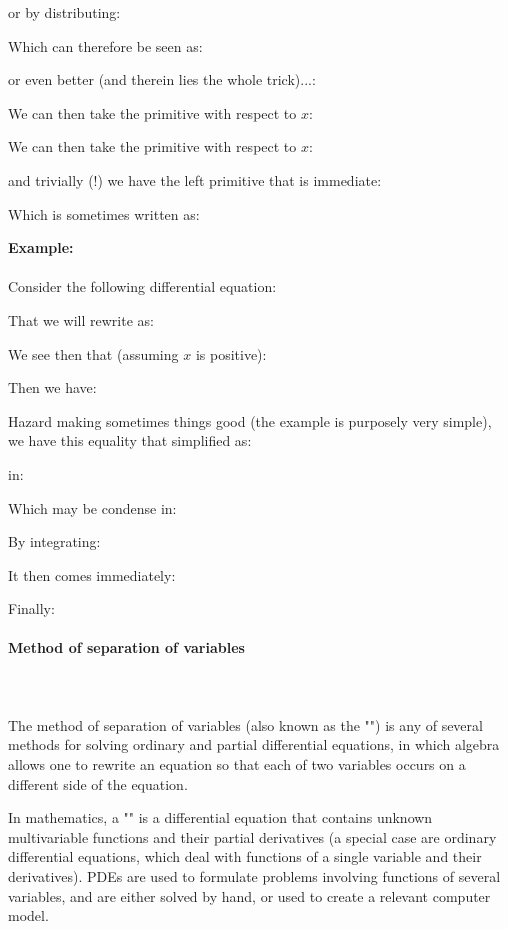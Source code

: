 	or by distributing:
		
	Which can therefore be seen as:
	
	or even better (and therein lies the whole trick)...:
	
	We can then take the primitive with respect to $x$:
	
	We can then take the primitive with respect to $x$:
	
	and trivially (!) we have the left primitive that is immediate:
	
	Which is sometimes written as:
	
	\begin{tcolorbox}[colframe=black,colback=white,sharp corners]
	\textbf{{\Large {}}Example:}\\\\
	Consider the following differential equation:
	
	That we will rewrite as:
	
	We see then that (assuming $x$ is positive):
	
	Then we have:
	
	Hazard making  sometimes things good (the example is purposely very simple), we have this equality that simplified as:
	
	in:
	
	Which may be condense in:
	
	By integrating:
	
	It then comes immediately:
	
	Finally:
	
	\end{tcolorbox}
	
	\pagebreak
	\paragraph{Method of separation of variables}\label{separation vaiables method}\mbox{}\\\\
	The method of separation of variables (also known as the "") is any of several methods for solving ordinary and partial differential equations, in which algebra allows one to rewrite an equation so that each of two variables occurs on a different side of the equation.
	
	In mathematics, a "" is a differential equation that contains unknown multivariable functions and their partial derivatives (a special case are ordinary differential equations, which deal with functions of a single variable and their derivatives). PDEs are used to formulate problems involving functions of several variables, and are either solved by hand, or used to create a relevant computer model.
	

